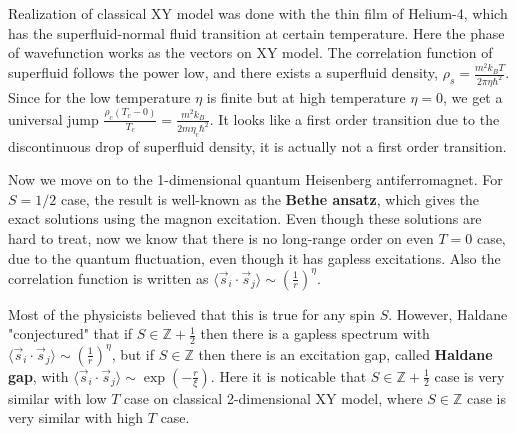 Realization of classical XY model was done with the thin film of Helium-4, which has the superfluid-normal fluid transition at certain temperature. Here the phase of wavefunction works as the vectors on XY model. The correlation function of superfluid follows the power low, and there exists a superfluid density, $\rho_s=\frac{m^2k_B T}{2\pi \eta \hbar^2}$. Since for the low temperature $\eta$ is finite but at high temperature $\eta=0$, we get a universal jump $\frac{\rho_c(T_c-0)}{T_c}=\frac{m^2k_B}{2m\eta_c\hbar^2}$. It looks like a first order transition due to the discontinuous drop of superfluid density, it is actually not a first order transition.

Now we move on to the 1-dimensional quantum Heisenberg antiferromagnet. For $S=1/2$ case, the result is well-known as the \textbf{Bethe ansatz}, which gives the exact solutions using the magnon excitation. Even though these solutions are hard to treat, now we know that there is no long-range order on even $T=0$ case, due to the quantum fluctuation, even though it has gapless excitations. Also the correlation function is written as $\langle \vec{s}_i\cdot \vec{s}_j\rangle\sim \left(\frac{1}{r}\right)^{\eta}$.

Most of the physicists believed that this is true for any spin $S$. However, Haldane "conjectured" that if $S\in\mathbb{Z}+\frac{1}{2}$ then there is a gapless spectrum with $\langle \vec{s}_i\cdot \vec{s}_j\rangle\sim \left(\frac{1}{r}\right)^{\eta}$, but if $S\in\mathbb{Z}$ then there is an excitation gap, called \textbf{Haldane gap}, with $\langle \vec{s}_i\cdot \vec{s}_j\rangle\sim \exp\left(-\frac{r}{\xi}\right)$. Here it is noticable that $S\in \mathbb{Z}+\frac{1}{2}$ case is very similar with low $T$ case on classical 2-dimensional XY model, where $S\in\mathbb{Z}$ case is very similar with high $T$ case.

